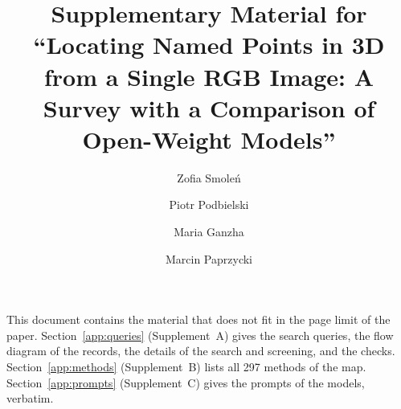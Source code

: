 \documentclass{llncs}
\newcommand{\papertitle}{Locating Named Points in 3D from a Single RGB Image:
A Survey with a Comparison of Open-Weight Models}
\begin{document}
\title{Supplementary Material for\\ ``\papertitle''}
\author{Zofia Smoleń \and
Piotr Podbielski \and
Maria Ganzha \and
Marcin Paprzycki}
\maketitle

This document contains the material that does not fit in the page limit of the paper.
Section~\ref{app:queries} (Supplement~A) gives the search queries, the flow diagram of the records, the details of the search and screening, and the checks.
Section~\ref{app:methods} (Supplement~B) lists all 297 methods of the map.
Section~\ref{app:prompts} (Supplement~C) gives the prompts of the models, verbatim.

\appendix

\clearpage


\end{document}
